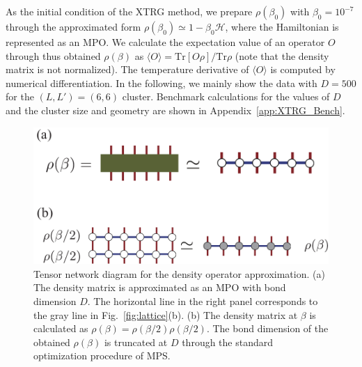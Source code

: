 \documentclass[twocolumn,superscriptaddress,showpacs, longbibliography, aps, prx]{revtex4-2}
\begin{document}
As the initial condition of the XTRG method, we prepare $\rho(\beta_0)$ with $\beta_0 = 10^{-7}$ through the approximated form $\rho(\beta_0) \simeq 1 - \beta_0\mathcal{H}$, where the Hamiltonian is represented as an MPO. 
We calculate the expectation value of an operator ${O}$ through thus obtained $\rho(\beta)$ as $\langle {O} \rangle = \mathrm{Tr}[{O}\rho] /\mathrm{Tr}\rho$ (note that the density matrix is not normalized). 
The temperature derivative of $\langle {O} \rangle$ is computed by numerical differentiation.
In the following, we mainly show the data with $D=500$ for the $(L, L') = (6, 6)$ cluster. 
Benchmark calculations for the values of $D$ and the cluster size and geometry are shown in Appendix~\ref{app:XTRG_Bench}. 

\begin{figure}[tbh]
  \begin{center}
    \includegraphics[width=\linewidth]{Figs/XTRG_MPO.pdf}
  \end{center}
  \caption{Tensor network diagram for the density operator approximation. (a) The density matrix is approximated as an MPO with bond dimension $D$. 
  The horizontal line in the right panel corresponds to the gray line in Fig.~\ref{fig:lattice}(b). 
  (b) The density matrix at $\beta$ is calculated as $\rho(\beta)=\rho(\beta/2)\rho(\beta/2)$. 
  The bond dimension of the obtained $\rho(\beta)$ is truncated at $D$ through the standard optimization procedure of MPS.}
  \label{fig:XTRG}
\end{figure}
\end{document}
